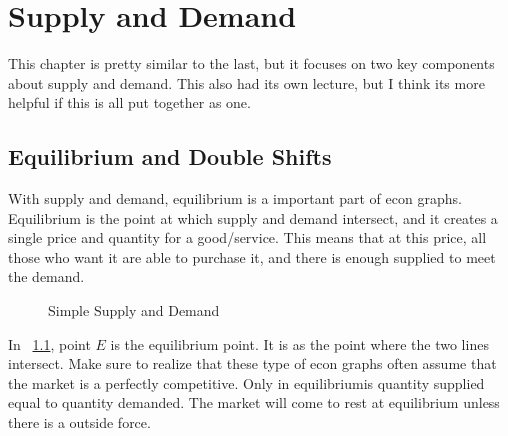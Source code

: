 \newpage
\chapter{\normalfont Supply and Demand}

This chapter is pretty similar to the last, but it focuses on two key components about supply and demand. This also had its own lecture, but I think its more helpful if this is all put together as one. 
\section{Equilibrium and Double Shifts}

With supply and demand, equilibrium is a important part of econ graphs. Equilibrium is the point at which supply and demand intersect, and it creates a single price and quantity for a good/service. This means that at this price, all those who want it are able to purchase it, and there is enough supplied to meet the demand. 

\begin{figure}[!h]
    \begin{center}
\caption{Simple Supply and Demand}
\label{fig:supdem}
\end{center}
\end{figure}

In ~\ref{fig:supdem}, point $E$ is the equilibrium point. It is as the point where the two lines intersect. Make sure to realize that these type of econ graphs often assume that the market is a perfectly competitive. Only in equilibriumis quantity supplied equal to quantity demanded. The market will come to rest at equilibrium unless there is a outside force. 

